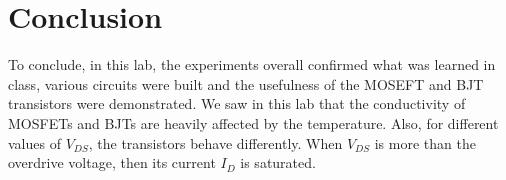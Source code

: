 \documentclass[journal]{IEEEtran}
\begin{document}
\section{Conclusion}
\par To conclude, in this lab, the experiments overall confirmed what was learned in class, various circuits were built and the usefulness of the MOSEFT and BJT transistors were demonstrated.
We saw in this lab that the conductivity of MOSFETs and BJTs are heavily affected by the temperature. Also, for different values of $V_{DS}$, the transistors behave differently. When $V_{DS}$ is more than the overdrive voltage, then its current  $I_{D}$ is saturated.
\end{document}
